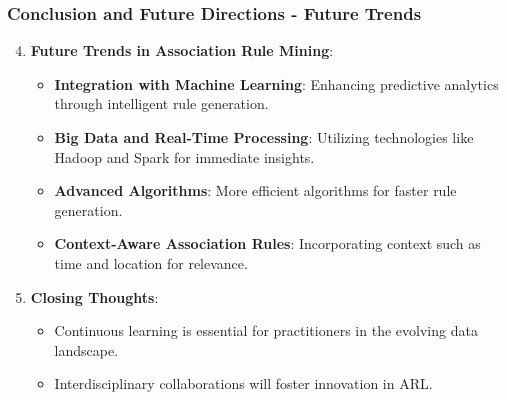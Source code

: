 \documentclass{beamer}
\begin{document}
\begin{frame}[fragile]
    \frametitle{Conclusion and Future Directions - Future Trends}
    \begin{enumerate}
        \setcounter{enumi}{3}
        \item \textbf{Future Trends in Association Rule Mining}:
        \begin{itemize}
            \item \textbf{Integration with Machine Learning}: Enhancing predictive analytics through intelligent rule generation.
            \item \textbf{Big Data and Real-Time Processing}: Utilizing technologies like Hadoop and Spark for immediate insights.
            \item \textbf{Advanced Algorithms}: More efficient algorithms for faster rule generation.
            \item \textbf{Context-Aware Association Rules}: Incorporating context such as time and location for relevance.
        \end{itemize}
        
        \item \textbf{Closing Thoughts}:
        \begin{itemize}
            \item Continuous learning is essential for practitioners in the evolving data landscape.
            \item Interdisciplinary collaborations will foster innovation in ARL.
        \end{itemize}
    \end{enumerate}
\end{frame}
\end{document}
